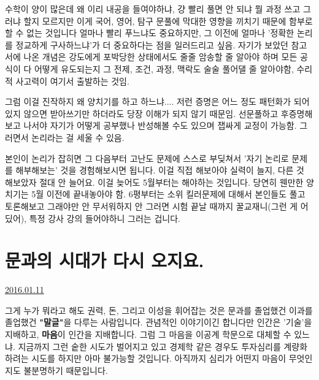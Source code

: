 수학이 양이 많은데 왜 이리 내공을 들여야하냐, 걍 빨리 풀면 안 되냐 뭘 과정 쓰고 그러냐 할지 모르지만
이게 국어, 영어, 탐구 문풀에 막대한 영향을 끼치기 때문에 함부로 할 수 없는 것입니다
얼마나 빨리 푸느냐도 중요하지만, 그 이전에 얼마나 '정확한 논리를 정교하게 구사하느냐'가 더 중요하다는 점을 일러드리고 싶음.
자기가 보았던 참고서에 나온 개념은 강도에게 포박당한 상태에서도 줄줄 암송할 줄 알아야 하며
모든 공식이 다 어떻게 유도되는지 그 전제, 조건, 과정, 맥락도 술술 풀어댈 줄 알아야함, 수리적 사고력이 여기서 출발하는 것임.
\vspace{5mm}

그럼 이걸 진작하지 왜 양치기를 하고 하느냐....
저런 증명은 어느 정도 패턴화가 되어있지 않으면 받아쓰기만 하더라도 당장 이해가 되지 않기 때문임.
선문풀하고 후증명해보고 나서야 자기가 어떻게 공부했나 반성해볼 수도 있으며 잽싸게 교정이 가능함.
그러면서 논리라는 걸 세울 수 있음.
\vspace{5mm}

본인이 논리가 잡히면 그 다음부터 고난도 문제에 스스로 부딪쳐서 '자기 논리로 문제를 해부해보는' 것을 경험해보시면 됩니다.
이걸 직접 해보아야 실력이 늘지, 다른 것 해보았자 절대 안 늘어요.
이걸 늦어도 5월부터는 해야하는 것입니다. 당연히 웬만한 양치기는 5월 이전에 끝내놓아야 함.
6평부터는 소위 킬러문제에 대해서 본인들도 풀고 토론해보고 그래야만 안 무서워하지 안 그러면
시험 끝날 때까지 꿀교재니(그런 게 어딨어), 특정 강사 강의 들어야하니 그러는 겁니다.
\vspace{5mm}





\section{문과의 시대가 다시 오지요.}
\href{https://www.kockoc.com/Apoc/584304}{2016.01.11}

\vspace{5mm}

그게 누가 뭐라고 해도
권력, 돈, 그리고 이성을 휘어잡는 것은 문과를 졸업했건 이과를 졸업했건
\textbf{"말글"}을 다루는 사람입니다.
관념적인 이야기이긴 합니다만
인간은 '기술'을 지배하고, \textbf{마음}이 인간을 지배합니다.
그럼 그 마음을 이공계 학문으로 대체할 수 있느냐. 지금까지 그런 숱한 시도가 벌어지고 있고
경제학 같은 경우도 투자심리를 계량화하려는 시도를 하지만 아마 불가능할 것입니다.
아직까지 심리가 어떤지 마음이 무엇인지도 불분명하기 때문입니다.
\vspace{5mm}

